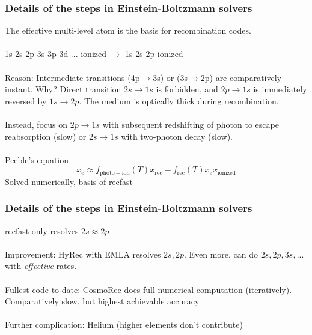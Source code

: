 \begin{frame}[fragile]
\frametitle{Details of the steps in Einstein-Boltzmann solvers}

The {\Red effective multi-level atom} is the basis for recombination codes.\\ \mbox{}\\

1s 2s 2p 3s 3p 3d ... ionized $\to$ 1s 2s 2p ionized \\ \mbox{}\\

\pause
Reason: Intermediate transitions (4p$\to$3s) or (3s$\to$2p) are comparatively instant. Why? Direct transition $2s \to 1s$ is forbidden, and $2p \to 1s$ is immediately reversed by $1s \to 2p$. The medium is {\Red optically thick} during recombination.\\ \mbox{}\\

\pause
Instead, focus on $2p \to 1s$ with subsequent redshifting of photon to escape reabsorption (slow) or $2s \to 1s$ with two-photon decay (slow). \\ \mbox{}\\

{\Red Peeble's equation}
\begin{equation}
	\dot{x_e} \approx f_\mathrm{photo-ion}(T) x_\mathrm{rec}-f_\mathrm{rec}(T) x_e x_\mathrm{ionized} 
\end{equation}
Solved numerically, basis of {\Red recfast}
\end{frame}



\begin{frame}[fragile]
	\frametitle{Details of the steps in Einstein-Boltzmann solvers}
	
	{\Red recfast} only resolves $2s \approx 2p$\\ \mbox{}\\
	\pause
	Improvement: {\Red HyRec} with EMLA resolves $2s,2p$. Even more, can do $2s,2p,3s,...$ with \textit{effective} rates.\\ \mbox{}\\
	
	Fullest code to date: {\Red CosmoRec} does full numerical computation (iteratively). Comparatively slow, but highest achievable accuracy\\ \mbox{}\\
	
	\pause
	Further complication: Helium (higher elements don't contribute)\\
\end{frame}


